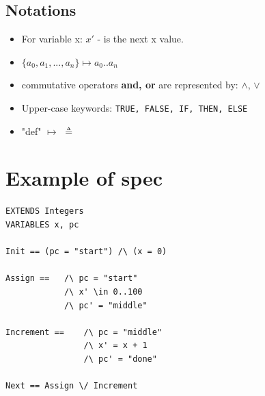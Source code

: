 \documentclass[11pt]{article}
\begin{document}
\subsection{Notations}
\begin{itemize}
\item For variable {x}: $x'$ - is the next x value.
\item $\{{a_0}, {a_1}, ..., {a_n}\} \longmapsto		{a_0}..{a_n}$
\item commutative operators \textbf{and, or} are represented by: $\land$, $\vee	$
\item Upper-case keywords: \texttt{TRUE, FALSE, IF, THEN, ELSE}
\item  "def"  $\longmapsto$	$\triangleq$
\end{itemize}

\section*{Example of spec}
\begin{lstlisting}
EXTENDS Integers
VARIABLES x, pc

Init == (pc = "start") /\ (x = 0)

Assign ==   /\ pc = "start"
            /\ x' \in 0..100
            /\ pc' = "middle"
             
Increment ==    /\ pc = "middle"
                /\ x' = x + 1
                /\ pc' = "done"
                
Next == Assign \/ Increment

\end{lstlisting}
\end{document}
